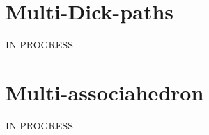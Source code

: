 \documentclass[12pt]{amsart}
\begin{document}



\section{Multi-Dick-paths}

IN PROGRESS


\section{Multi-associahedron}

IN PROGRESS



\end{document}
